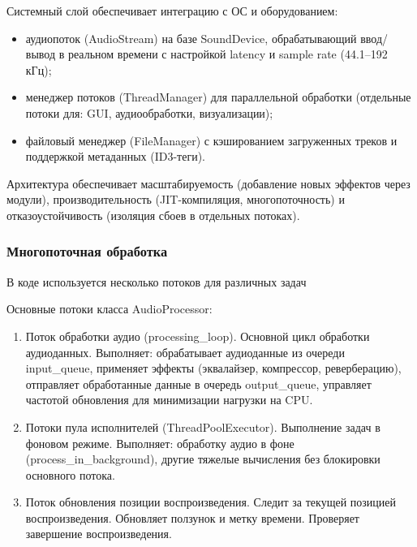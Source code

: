 Системный слой обеспечивает интеграцию с ОС и оборудованием:
\begin{itemize}
	\item аудиопоток (AudioStream) на базе SoundDevice, обрабатывающий ввод/вывод в реальном времени с настройкой latency и sample rate (44.1–192 кГц);
	\item менеджер потоков (ThreadManager) для параллельной обработки (отдельные потоки для: GUI, аудиообработки, визуализации);
	\item файловый менеджер (FileManager) с кэшированием загруженных треков и поддержкой метаданных (ID3-теги).
\end{itemize}

Архитектура обеспечивает масштабируемость (добавление новых эффектов через модули), производительность (JIT-компиляция, многопоточность) и отказоустойчивость (изоляция сбоев в отдельных потоках).

\subsubsection{Многопоточная обработка}

В коде используется несколько потоков для различных задач

Основные потоки класса AudioProcessor:
\begin{enumerate}
	\item Поток обработки аудио (processing\_loop). Основной цикл обработки аудиоданных. Выполняет: обрабатывает аудиоданные из очереди input\_queue, применяет эффекты (эквалайзер, компрессор, реверберацию), отправляет обработанные данные в очередь output\_queue, управляет частотой обновления для минимизации нагрузки на CPU.
	\item Потоки пула исполнителей (ThreadPoolExecutor). Выполнение задач в фоновом режиме. Выполняет: обработку аудио в фоне (process\_in\_background), другие тяжелые вычисления без блокировки основного потока.
	\item Поток обновления позиции воспроизведения. Следит за текущей позицией воспроизведения. Обновляет ползунок и метку времени. Проверяет завершение воспроизведения.
\end{enumerate}

